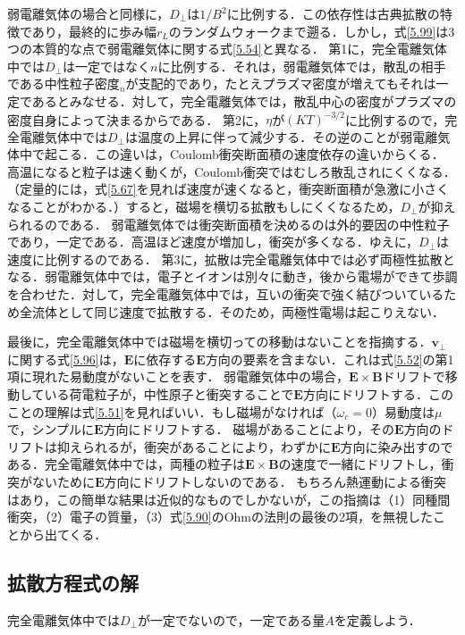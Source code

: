 \documentclass{ltjsarticle}
\numberwithin{equation}{section} %
\begin{document}
弱電離気体の場合と同様に，$D_\perp$は$1/B^2$に比例する．この依存性は古典拡散の特徴であり，最終的に歩み幅$r_L$のランダムウォークまで遡る．しかし，式\eqref{5.99}は3つの本質的な点で弱電離気体に関する式\eqref{5.54}と異なる．
第1に，完全電離気体中では$D_\perp$は一定ではなく$n$に比例する．それは，弱電離気体では，散乱の相手である中性粒子密度$_n$が支配的であり，たとえプラズマ密度が増えてもそれは一定であるとみなせる．対して，完全電離気体では，散乱中心の密度がプラズマの密度自身によって決まるからである．
第2に，$\eta$が$(KT)^{-3/2}$に比例するので，完全電離気体中では$D_\perp$は温度の上昇に伴って減少する．その逆のことが弱電離気体中で起こる．この違いは，Coulomb衝突断面積の速度依存の違いからくる．
高温になると粒子は速く動くが，Coulomb衝突ではむしろ散乱されにくくなる．（定量的には，式\eqref{5.67}を見れば速度が速くなると，衝突断面積が急激に小さくなることがわかる．）すると，磁場を横切る拡散もしにくくなるため，$D_\perp$が抑えられるのである．
弱電離気体では衝突断面積を決めるのは外的要因の中性粒子であり，一定である．高温ほど速度が増加し，衝突が多くなる．ゆえに，$D_\perp$は速度に比例するのである．
第3に，拡散は完全電離気体中では必ず両極性拡散となる．弱電離気体中では，電子とイオンは別々に動き，後から電場ができて歩調を合わせた．対して，完全電離気体中では，互いの衝突で強く結びついているため全流体として同じ速度で拡散する．そのため，両極性電場は起こりえない．

最後に，完全電離気体中では磁場を横切っての移動はないことを指摘する．$\bm{v}_\perp$に関する式\eqref{5.96}は，$\bm{E}$に依存する$\bm{E}$方向の要素を含まない．これは式\eqref{5.52}の第1項に現れた易動度がないことを表す．
弱電離気体中の場合，$\bm{E}\times \bm{B}$ドリフトで移動している荷電粒子が，中性原子と衝突することで$\bm{E}$方向にドリフトする．このことの理解は式\eqref{5.51}を見ればいい．もし磁場がなければ（$\omega_c=0$）易動度は$\mu$で，シンプルに$\bm{E}$方向にドリフトする．
磁場があることにより，その$\bm{E}$方向のドリフトは抑えられるが，衝突があることにより，わずかに$\bm{E}$方向に染み出すのである．完全電離気体中では，両種の粒子は$\bm{E}\times \bm{B}$の速度で一緒にドリフトし，衝突がないために$\bm{E}$方向にドリフトしないのである．
もちろん熱運動による衝突はあり，この簡単な結果は近似的なものでしかないが，この指摘は（1）同種間衝突，（2）電子の質量，（3）式\eqref{5.90}のOhmの法則の最後の2項，を無視したことから出てくる．


\subsection{拡散方程式の解} \label{section5.9}
完全電離気体中では$D_\perp$が一定でないので，一定である量$A$を定義しよう．
\end{document}
